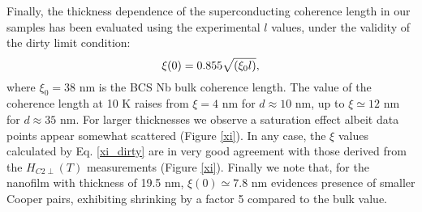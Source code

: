 \documentclass[reprint,onecolumn,superscriptaddress,a4paper,nofootinbib,floatfix]{revtex4-1}
\begin{document}
Finally, the thickness dependence of the superconducting coherence length in our samples has been evaluated using the experimental $l$ values, under the validity of the dirty limit condition:
\begin{equation}
\centering
\xi(0) = 0.855\sqrt{\left(\xi_0 l\right)},
\label{xi_dirty}
\end{equation}
where $\xi_0 = 38$ nm is the BCS Nb bulk coherence length. The value of the coherence length at 10 K raises from $\xi = 4$ nm for $d \approx 10$ nm, up to $\xi \simeq 12$ nm for $d \approx 35$ nm. For larger thicknesses we observe a saturation effect albeit data points appear somewhat scattered (Figure \ref{xi}). In any case, the $\xi$ values calculated by Eq. \eqref{xi_dirty} are in very good agreement with those derived from the $H_{C2\perp}(T)$ measurements (Figure \ref{xi}). Finally we note that, for the nanofilm with thickness of 19.5 nm, $\xi(0) \simeq 7.8$ nm evidences presence of smaller Cooper pairs, exhibiting shrinking by a factor 5 compared to the bulk value. 
\end{document}
